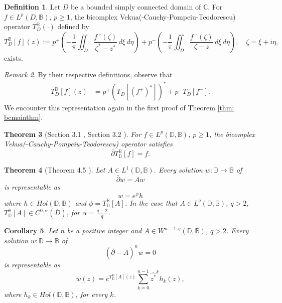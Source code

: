 \documentclass[12pt,reqno]{amsart}
\newtheorem{theorem}{Theorem}[section]
\newtheorem{corr}[theorem]{Corollary}
\theoremstyle{definition}
\newtheorem{deff}[theorem]{Definition}
\theoremstyle{remark}
\newtheorem{comm}[theorem]{Remark}
\newcommand{\dbar}{\bar\partial}
\newcommand{\bc}{\mathbb{B}}
\newcommand{\disk}{\mathbb{D}}
\begin{document}
            \begin{deff}
                Let $D$ be a bounded simply connected domain of $\mathbb{C}$. For $f \in L^p(D, \bc)$, $p\geq 1$, the bicomplex Vekua(-Cauchy-Pompeiu-Teodorescu) operator $T_D^\bc(\cdot)$ defined by 
                \[
                    T_D^\bc[f](z) := p^+\left( -\frac{1}{\pi} \iint_D \frac{f^+(\zeta)}{\zeta^*-z^*}\,d\xi\,d\eta\right) + p^- \left(-\frac{1}{\pi} \iint_D \frac{f^-(\zeta)}{\zeta-z}\,d\xi\,d\eta\right),\quad \zeta = \xi + i\eta,
                \]
                exists.
            \end{deff}

            \begin{comm}
                By their respective definitions, observe that
                \begin{align*}
                    T_D^\bc[f](z) 
                    &= p^+ (T_D[(f^+)^*])^* + p^- T_D[f^-].
                \end{align*}
                We encounter this representation again in the first proof of Theorem \ref{thm: bcmainthm}.
            \end{comm}

            \begin{theorem}[Section 3.1 \cite{FundBicomplex}, Section 3.2 \cite{BCTransmutation}]
                For $f \in L^p(\disk, \bc)$, $p\geq 1$, the bicomplex Vekua(-Cauchy-Pompeiu-Teodorescu) operator satisfies
                \[
                    \dbar T_\disk^\bc[f] = f.
                \]
            \end{theorem}

            \begin{theorem}[Theorem 4.5 \cite{BCHoiv}]\label{thm: fourpointfivebchoiv}
                Let $A \in L^1(\disk,\bc)$. Every solution $w:\disk\to\bc$ of 
                \[
                    \dbar w = Aw
                \]
                is representable as 
                \[
                    w = e^\phi h
                \]
                where $h \in Hol(\disk,\bc)$ and $\phi = T_\disk^\bc[A]$. In the case that $A \in L^q(\disk,\bc)$, $q>2$, $T_\disk^\bc[A] \in C^{0,\alpha}(\overline{D})$, for $\alpha = \frac{q-2}{q}$. 
            \end{theorem}

            \begin{corr}\label{corr: bcsimprinhoivrep}
                Let $n$ be a positive integer and $A \in W^{n-1, q}(\disk,\bc)$, $q>2$. Every solution $w: \disk \to\bc$ of 
                \[
                    (\dbar- A)^n w = 0
                \]
                is representable as 
                \[
                    w(z) = e^{T_\disk^\bc[A](z)}\sum_{k=0}^{n-1} \widehat{z^*}^k h_k(z),
                \]
                where $h_k\in Hol(\disk,\bc)$, for every $k$. 
            \end{corr}
\end{document}
